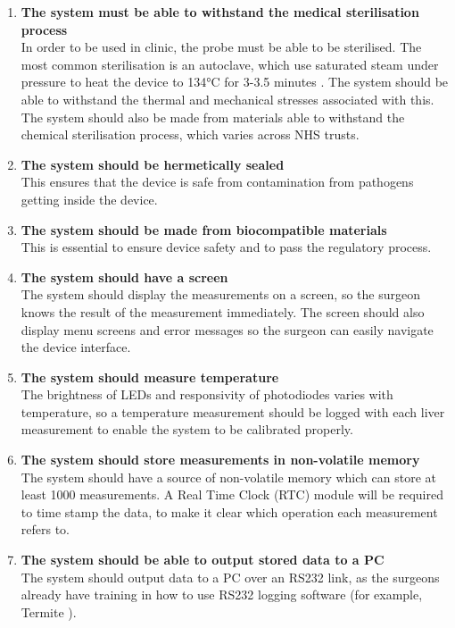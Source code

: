 \begin{enumerate}
\item \label{req: sterilise} \textbf{The system must be able to withstand the medical sterilisation process}\\
In order to be used in clinic, the probe must be able to be sterilised. The most common sterilisation is an autoclave, which use saturated steam under pressure to heat the device to 134\si{\celsius} for 3-3.5 minutes \cite{nhs_autoclave}. The system should be able to withstand the thermal and mechanical stresses associated with this. The system should also be made from materials able to withstand the chemical sterilisation process, which varies across NHS trusts.

\item \label{req: seal} \textbf{The system should be hermetically sealed}\\
This ensures that the device is safe from contamination from pathogens getting inside the device.

\item \label{req: biocompatible} \textbf{The system should be made from biocompatible materials}\\
This is essential to ensure device safety and to pass the regulatory process.




\item \label{req: screen} \textbf{The system should have a screen}\\
The system should display the measurements on a screen, so the surgeon knows the result of the measurement immediately. The screen should also display menu screens and error messages so the surgeon can easily navigate the device interface.

\item \label{req: temperature} \textbf{The system should measure temperature}\\
The brightness of LEDs and responsivity of photodiodes varies with temperature, so a temperature measurement should be logged with each liver measurement to enable the system to be calibrated properly.

\item \label{req: memory} \textbf{The system should store measurements in non-volatile memory}\\
The system should have a source of non-volatile memory which can store at least 1000 measurements. A Real Time Clock (RTC) module will be required to time stamp the data, to make it clear which operation each measurement refers to.

\item \label{req: rs232} \textbf{The system should be able to output stored data to a PC}\\
The system should output data to a PC over an RS232 link, as the surgeons already have training in how to use RS232 logging software (for example, Termite \cite{termite}).


\end{enumerate}